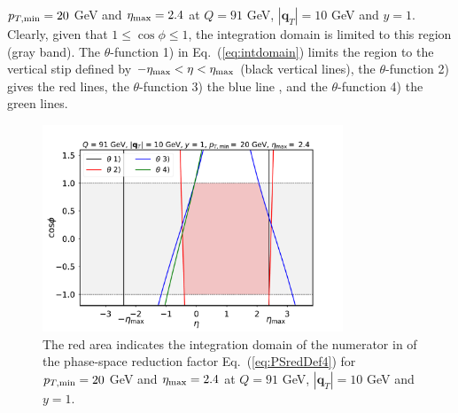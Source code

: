 \documentclass[10pt,a4paper]{article}
\begin{document}
$p_{T,\rm min}=20$ GeV and $\eta_{\rm max}=2.4$ at $Q=91$ GeV,
$|\mathbf{q}_T|=10$ GeV and $y=1$.  Clearly, given that
$1\leq\cos\phi\leq 1$, the integration domain is limited to this
region (gray band). The $\theta$-function 1) in
Eq.~(\ref{eq:intdomain}) limits the region to the vertical stip
defined by $-\eta_{\rm max} < \eta < \eta_{\rm max}$ (black vertical
lines), the $\theta$-function 2) gives the red lines, the
$\theta$-function 3) the blue line , and the $\theta$-function 4) the
green lines.
\begin{figure}[h]
  \begin{centering}
    \includegraphics[width=0.8\textwidth]{plots/IntDomain}
    \caption{The red area indicates the integration domain of the
      numerator in of the phase-space reduction factor
      Eq.~(\ref{eq:PSredDef4}) for $p_{T,\rm min}=20$ GeV and
      $\eta_{\rm max}=2.4$ at $Q=91$ GeV, $|\mathbf{q}_T|=10$ GeV and
      $y=1$.\label{fig:IntDomain}}
  \end{centering}
\end{figure}
\end{document}
